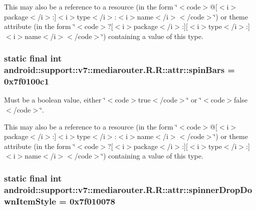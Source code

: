 This may also be a reference to a resource (in the form \char`\"{}$<$code$>$@\mbox{[}$<$i$>$package$<$/i$>$:\mbox{]}$<$i$>$type$<$/i$>$:$<$i$>$name$<$/i$>$$<$/code$>$\char`\"{}) or theme attribute (in the form \char`\"{}$<$code$>$?\mbox{[}$<$i$>$package$<$/i$>$:\mbox{]}\mbox{[}$<$i$>$type$<$/i$>$:\mbox{]}$<$i$>$name$<$/i$>$$<$/code$>$\char`\"{}) containing a value of this type. \hypertarget{classandroid_1_1support_1_1v7_1_1mediarouter_1_1_r_1_1attr_59d102b3cc98d1dd1b971a14fb0e12d8}{
\subsubsection[{spinBars}]{\setlength{\rightskip}{0pt plus 5cm}static final int android::support::v7::mediarouter.R.R::attr::spinBars = 0x7f0100c1}}
\label{classandroid_1_1support_1_1v7_1_1mediarouter_1_1_r_1_1attr_59d102b3cc98d1dd1b971a14fb0e12d8}


Must be a boolean value, either \char`\"{}$<$code$>$true$<$/code$>$\char`\"{} or \char`\"{}$<$code$>$false$<$/code$>$\char`\"{}. 

This may also be a reference to a resource (in the form \char`\"{}$<$code$>$@\mbox{[}$<$i$>$package$<$/i$>$:\mbox{]}$<$i$>$type$<$/i$>$:$<$i$>$name$<$/i$>$$<$/code$>$\char`\"{}) or theme attribute (in the form \char`\"{}$<$code$>$?\mbox{[}$<$i$>$package$<$/i$>$:\mbox{]}\mbox{[}$<$i$>$type$<$/i$>$:\mbox{]}$<$i$>$name$<$/i$>$$<$/code$>$\char`\"{}) containing a value of this type. \hypertarget{classandroid_1_1support_1_1v7_1_1mediarouter_1_1_r_1_1attr_2b89ef57d3b9792b385719f3c942f4bd}{
\subsubsection[{spinnerDropDownItemStyle}]{\setlength{\rightskip}{0pt plus 5cm}static final int android::support::v7::mediarouter.R.R::attr::spinnerDropDownItemStyle = 0x7f010078}}
\label{classandroid_1_1support_1_1v7_1_1mediarouter_1_1_r_1_1attr_2b89ef57d3b9792b385719f3c942f4bd}


